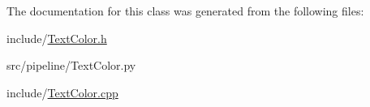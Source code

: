 The documentation for this class was generated from the following files\+:\begin{DoxyCompactItemize}
\item 
include/\hyperlink{TextColor_8h}{Text\+Color.\+h}\item 
src/pipeline/Text\+Color.\+py\item 
include/\hyperlink{TextColor_8cpp}{Text\+Color.\+cpp}\end{DoxyCompactItemize}
